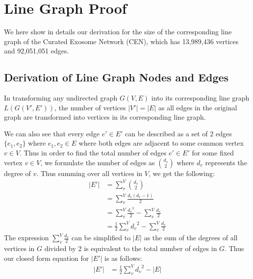 \documentclass[12pt, oneside]{article}   	%
\begin{document}
\section{Line Graph Proof} 

We here show in details our derivation for the size of the corresponding line graph of the Curated Exosome Network (CEN), which has 
13,989,436 vertices and 92,051,051 edges.

\subsection{Derivation of Line Graph Nodes and Edges}

In transforming any undirected graph $G(V, E)$ into its corresponding line graph $L(G(V', E'))$, the number of vertices $|V'| = |E|$ as all edges in the original graph are transformed into vertices in its corresponding line graph.

We can also see that every edge $e' \in E'$ can be described as a set of 2 edges $\{e_1, e_2\}$ where $e_1,  e_2 \in E$ where both edges are adjacent to some common vertex $v \in V$.  
Thus in order to find the total number of edges $e' \in E'$ for some fixed vertex $v \in V$, we formulate the number of edges as $d_v \choose 2$ where $d_v$ represents the degree of $v$. Thus summing over all vertices in $V$, we get the following:
\begin{equation}
    \begin{aligned}
    |E'| &= \sum^{V}_{v} {d_v \choose 2}\\
    &= \sum^{V}_{v} \frac{d_v(d_v - 1)}{2}\\
    &= \sum^{V}_{v} \frac{{d_v}^2}{2} - \sum^{V}_{v} \frac{d_v}{2}\\
    &= \frac{1}{2}\sum^{V}_{v} {d_v}^2 - \sum^{V}_{v} \frac{d_v}{2}
    \end{aligned}
\end{equation}
The expression $\sum^{V}_{v} \frac{d_v}{2}$ can be simplified to $|E|$ as the sum of the degrees of all vertices in $G$ divided by 2 is equivalent to the total number of edges in $G$. Thus our closed form equation for $|E'|$ is as follows:
\begin{equation}
    \begin{aligned}
    |E'| &= \frac{1}{2}\sum^{V}_{v} {d_v}^2 - |E|
    \end{aligned}
\end{equation}
\end{document}
